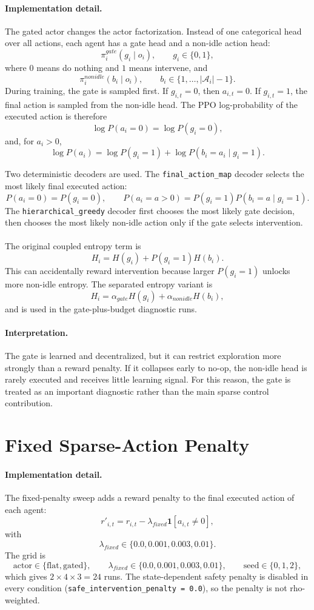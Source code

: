 \paragraph{Implementation detail.}
The gated actor changes the actor factorization. Instead of one categorical
head over all actions, each agent has a gate head and a non-idle action head:
\[
  \pi_i^{gate}(g_i\mid o_i),\qquad g_i\in\{0,1\},
\]
where \(0\) means do nothing and \(1\) means intervene, and
\[
  \pi_i^{nonidle}(b_i\mid o_i),\qquad
  b_i\in\{1,\ldots,|\mathcal A_i|-1\}.
\]
During training, the gate is sampled first. If \(g_{i,t}=0\), then
\(a_{i,t}=0\). If \(g_{i,t}=1\), the final action is sampled from the non-idle
head. The PPO log-probability of the executed action is therefore
\[
  \log P(a_i=0)=\log P(g_i=0),
\]
and, for \(a_i>0\),
\[
  \log P(a_i)=\log P(g_i=1)+\log P(b_i=a_i\mid g_i=1).
\]

\noindent Two deterministic decoders are used. The \texttt{final\_action\_map} decoder
selects the most likely final executed action:
\[
  P(a_i=0)=P(g_i=0),\qquad
  P(a_i=a>0)=P(g_i=1)P(b_i=a\mid g_i=1).
\]
The \texttt{hierarchical\_greedy} decoder first chooses the most likely gate
decision, then chooses the most likely non-idle action only if the gate selects
intervention.
\\
\\
The original coupled entropy term is
\[
  H_i=H(g_i)+P(g_i=1)H(b_i).
\]
This can accidentally reward intervention because larger \(P(g_i=1)\) unlocks
more non-idle entropy. The separated entropy variant is
\[
  H_i=\alpha_{gate}H(g_i)+\alpha_{nonidle}H(b_i),
\]
and is used in the gate-plus-budget diagnostic runs.

\paragraph{Interpretation.}
The gate is learned and decentralized, but it can restrict exploration more
strongly than a reward penalty. If it collapses early to no-op, the non-idle
head is rarely executed and receives little learning signal. For this reason,
the gate is treated as an important diagnostic rather than the main sparse
control contribution.

\section{Fixed Sparse-Action Penalty}
\label{subsec:sparse-control-fixed-penalty}

\paragraph{Implementation detail.}
The fixed-penalty sweep adds a reward penalty to the final executed action of
each agent:
\[
  r'_{i,t}=r_{i,t}
  -\lambda_{fixed}\mathbf{1}[a_{i,t}\neq0],
\]
with
\[
  \lambda_{fixed}\in\{0.0,0.001,0.003,0.01\}.
\]
The grid is
\[
  \text{actor}\in\{\text{flat},\text{gated}\},\qquad
  \lambda_{fixed}\in\{0.0,0.001,0.003,0.01\},\qquad
  \text{seed}\in\{0,1,2\},
\]
which gives \(2\times4\times3=24\) runs. The state-dependent safety penalty is
disabled in every condition (\texttt{safe\_intervention\_penalty = 0.0}), so
the penalty is not rho-weighted.


